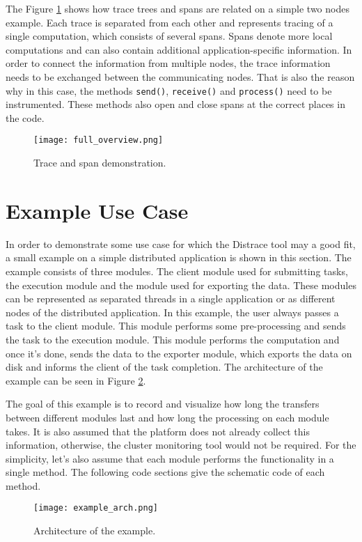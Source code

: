 The Figure \ref{fig:full_overview} shows how trace trees and spans are related on a simple two nodes example. Each trace is separated from each other and represents tracing of a single computation, which consists of several spans. Spans denote more local computations and can also contain additional application-specific information. In order to connect the information from multiple nodes, the trace information needs to be exchanged between the communicating nodes. That is also the reason why in this case, the methods \texttt{send()}, \texttt{receive()} and \texttt{process()} need to be instrumented. These methods also open and close spans at the correct places in the code.
\begin{figure}
	\centering
	\texttt{[image: full\_overview.png]}
	\caption{Trace and span demonstration. }
	\label{fig:full_overview}
\end{figure}
\section{Example Use Case}
\label{design:use_case}
In order to demonstrate some use case for which the Distrace tool may a good fit, a small example on a simple distributed application is shown in this section. The example consists of three modules. The client module used for submitting tasks, the execution module and the module used for exporting the data. These modules can be represented as separated threads in a single application or as different nodes of the distributed application. In this example, the user always passes a task to the client module. This module performs some pre-processing and sends the task to the execution module. This module performs the computation and once it's done, sends the data to the exporter module, which exports the data on disk and informs the client of the task completion. The architecture of the example can be seen in Figure \ref{fig:example_arch}.

The goal of this example is to record and visualize how long the transfers between different modules last and how long the processing on each module takes. It is also assumed that the platform does not already collect this information, otherwise, the cluster monitoring tool would not be required. For the simplicity, let's also assume that each module performs the functionality in a single method. The following code sections give the schematic code of each method.

	\begin{figure}
		\centering
		\texttt{[image: example\_arch.png]}
		\caption{Architecture of the example.}
		\label{fig:example_arch}
	\end{figure}



